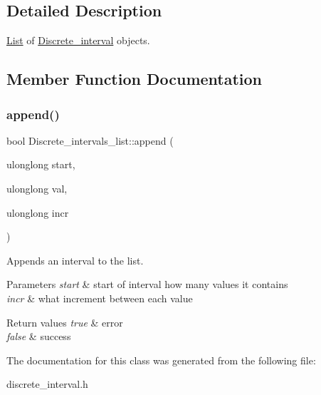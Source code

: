 \subsection{Detailed Description}
\mbox{\hyperlink{classList}{List}} of \mbox{\hyperlink{classDiscrete__interval}{Discrete\+\_\+interval}} objects. 

\subsection{Member Function Documentation}
\mbox{\label{classDiscrete__intervals__list_a265c2726cfcc9d3a9349a914136583e7}} 
\subsubsection{\texorpdfstring{append()}{append()}}
{\footnotesize\ttfamily bool Discrete\+\_\+intervals\+\_\+list\+::append (\begin{DoxyParamCaption}\item[{ulonglong}]{start,  }\item[{ulonglong}]{val,  }\item[{ulonglong}]{incr }\end{DoxyParamCaption})\hspace{0.3cm}{\ttfamily [inline]}}

Appends an interval to the list.


\begin{DoxyParams}{Parameters}
{\em start} & start of interval  how many values it contains \\
\hline
{\em incr} & what increment between each value \\
\hline
\end{DoxyParams}

\begin{DoxyRetVals}{Return values}
{\em true} & error \\
\hline
{\em false} & success \\
\hline
\end{DoxyRetVals}


The documentation for this class was generated from the following file\+:\begin{DoxyCompactItemize}
\item 
discrete\+\_\+interval.\+h\end{DoxyCompactItemize}
